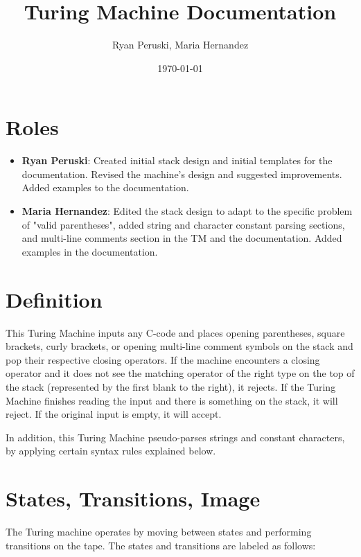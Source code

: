 \documentclass{article}
\title{Turing Machine Documentation}
\author{Ryan Peruski, Maria Hernandez}
\date{\today}
\begin{document}
\maketitle
\section{Roles}

\begin{itemize}
    \item \textbf{Ryan Peruski}: Created initial stack design and initial templates for the documentation. Revised the machine's design and suggested improvements. Added examples to the documentation.
    \item \textbf{Maria Hernandez}: Edited the stack design to adapt to the specific problem of "valid parentheses", added string and character constant parsing sections, and multi-line comments section
    in the TM and the documentation. Added examples in the documentation.
\end{itemize}

\section{Definition}
This Turing Machine inputs any C-code and places opening parentheses, square brackets, curly brackets, or opening multi-line comment symbols on the stack and pop their respective closing operators. If the machine encounters a closing operator and 
it does not see the matching operator of the right type on the top of the stack (represented by the first blank to the right), 
it rejects. If the Turing Machine finishes reading the input and there is something on the stack, it will reject. 
If the original input is empty, it will accept. 

In addition, this Turing Machine pseudo-parses strings and constant characters, by applying certain syntax rules explained below. 

\section{States, Transitions, Image}
The Turing machine operates by moving between states and performing transitions on the tape. The states and transitions are labeled as follows:
\end{document}
